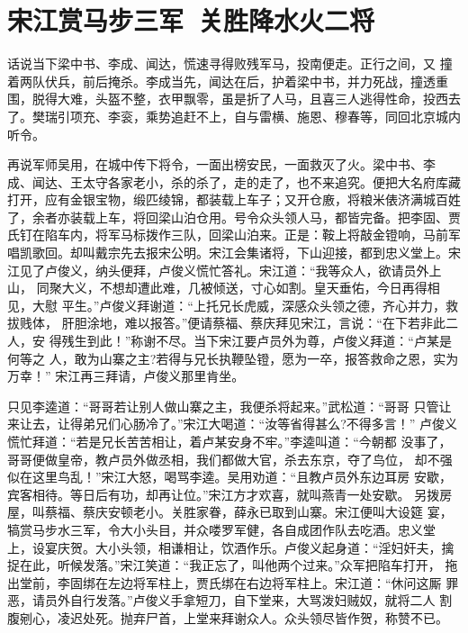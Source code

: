 \chapter{宋江赏马步三军~关胜降水火二将}

话说当下梁中书、李成、闻达，慌速寻得败残军马，投南便走。正行之间，又
撞着两队伏兵，前后掩杀。李成当先，闻达在后，护着梁中书，并力死战，撞透重
围，脱得大难，头盔不整，衣甲飘零，虽是折了人马，且喜三人逃得性命，投西去
了。樊瑞引项充、李衮，乘势追赶不上，自与雷横、施恩、穆春等，同回北京城内
听令。

再说军师吴用，在城中传下将令，一面出榜安民，一面救灭了火。梁中书、李
成、闻达、王太守各家老小，杀的杀了，走的走了，也不来追究。便把大名府库藏
打开，应有金银宝物，缎匹绫锦，都装载上车子；又开仓廒，将粮米俵济满城百姓
了，余者亦装载上车，将回梁山泊仓用。号令众头领人马，都皆完备。把李固、贾
氏钉在陷车内，将军马标拨作三队，回梁山泊来。正是：鞍上将敲金镫响，马前军
唱凯歌回。却叫戴宗先去报宋公明。宋江会集诸将，下山迎接，都到忠义堂上。宋
江见了卢俊义，纳头便拜，卢俊义慌忙答礼。宋江道：“我等众人，欲请员外上山，
同聚大义，不想却遭此难，几被倾送，寸心如割。皇天垂佑，今日再得相见，大慰
平生。”卢俊义拜谢道：“上托兄长虎威，深感众头领之德，齐心并力，救拔贱体，
肝胆涂地，难以报答。”便请蔡福、蔡庆拜见宋江，言说：“在下若非此二人，安
得残生到此！”称谢不尽。当下宋江要卢员外为尊，卢俊义拜道：“卢某是何等之
人，敢为山寨之主?若得与兄长执鞭坠镫，愿为一卒，报答救命之恩，实为万幸！”
宋江再三拜请，卢俊义那里肯坐。

只见李逵道：“哥哥若让别人做山寨之主，我便杀将起来。”武松道：“哥哥
只管让来让去，让得弟兄们心肠冷了。”宋江大喝道：“汝等省得甚么?不得多言！”
卢俊义慌忙拜道：“若是兄长苦苦相让，着卢某安身不牢。”李逵叫道：“今朝都
没事了，哥哥便做皇帝，教卢员外做丞相，我们都做大官，杀去东京，夺了鸟位，
却不强似在这里鸟乱！”宋江大怒，喝骂李逵。吴用劝道：“且教卢员外东边耳房
安歇，宾客相待。等日后有功，却再让位。”宋江方才欢喜，就叫燕青一处安歇。
另拨房屋，叫蔡福、蔡庆安顿老小。关胜家眷，薛永已取到山寨。宋江便叫大设筵
宴，犒赏马步水三军，令大小头目，并众喽罗军健，各自成团作队去吃酒。忠义堂
上，设宴庆贺。大小头领，相谦相让，饮酒作乐。卢俊义起身道：“淫妇奸夫，擒
捉在此，听候发落。”宋江笑道：“我正忘了，叫他两个过来。”众军把陷车打开，
拖出堂前，李固绑在左边将军柱上，贾氏绑在右边将军柱上。宋江道：“休问这厮
罪恶，请员外自行发落。”卢俊义手拿短刀，自下堂来，大骂泼妇贼奴，就将二人
割腹剜心，凌迟处死。抛弃尸首，上堂来拜谢众人。众头领尽皆作贺，称赞不已。

